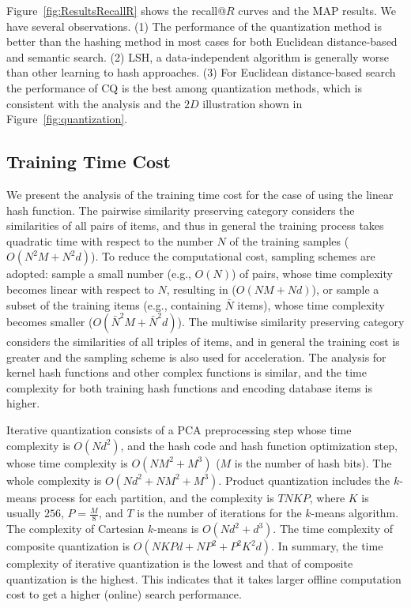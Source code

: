 \documentclass[10pt,journal,compsoc]{IEEEtran}
\begin{document}
Figure~\ref{fig:ResultsRecallR} shows the recall@$R$ curves and the MAP results.
We have several observations.
(1) The performance of the quantization method is better than the hashing method in most cases
for both Euclidean distance-based and semantic search.
(2) LSH, a data-independent algorithm is generally worse than other learning to hash approaches.
(3) For Euclidean distance-based search
the performance of CQ
is the best among quantization methods,
which is
consistent with the analysis
and the $2D$ illustration shown in Figure~\ref{fig:quantization}.





\subsection{Training Time Cost}
We present the analysis of the training time cost
for the case of using the linear hash function.
The pairwise similarity preserving category
considers the similarities
of all pairs of items,
and thus in general the training process
takes quadratic time
with respect to the number $N$ of the training samples
($O(N^2M + N^2d)$).
To reduce the computational cost,
sampling schemes are adopted:
sample a small number (e.g., $O(N)$) of pairs,
whose time complexity becomes linear with respect to $N$, resulting in
($O(NM + Nd)$),
or sample a subset of the training items
(e.g., containing $\bar{N}$ items),
whose time complexity becomes smaller
($O(\bar{N}^2M + \bar{N}^2d)$).
The multiwise similarity preserving category considers the similarities
of all triples of items,
and in general the training cost is greater
and the sampling scheme is also used for acceleration.
The analysis for kernel hash functions and other complex functions
is similar,
and the time complexity for both training hash functions
and encoding database items is higher.

Iterative quantization consists of a PCA preprocessing step
whose time complexity is $O(Nd^2)$,
and the hash code and hash function optimization step,
whose time complexity is $O(NM^2 + M^3)$ ($M$ is the number of hash bits).
The whole complexity is $O(Nd^2 + NM^2 + M^3)$.
Product quantization includes the $k$-means process for each partition,
and the complexity is $TNKP$,
where $K$ is usually $256$, $P = \frac{M}{8}$,
and $T$ is the number of iterations for the $k$-means algorithm.
The complexity of Cartesian $k$-means
is $O(Nd^2 + d^3)$.
The time complexity of composite quantization
is $O(NKPd + NP^2 + P^2K^2d)$.
In summary,
the time complexity of iterative quantization is the lowest
and that of composite quantization is the highest.
This indicates that it takes larger offline computation cost
to get a higher (online) search performance.
\end{document}
